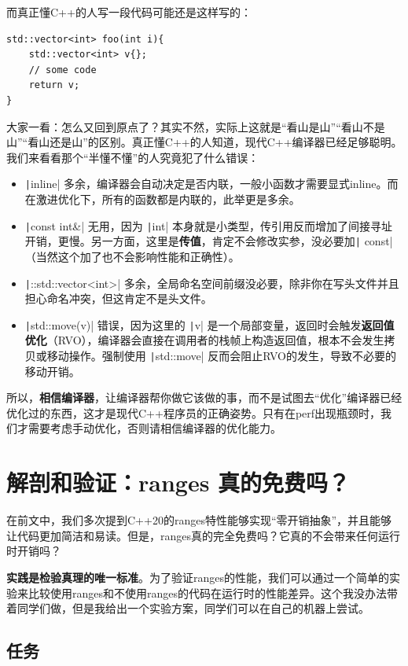 而真正懂C++的人写一段代码可能还是这样写的：
\begin{verbatim}
std::vector<int> foo(int i){
    std::vector<int> v{};
    // some code
    return v;
}
\end{verbatim}

大家一看：怎么又回到原点了？其实不然，实际上这就是“看山是山”“看山不是山”“看山还是山”的区别。真正懂C++的人知道，现代C++编译器已经足够聪明。我们来看看那个“半懂不懂”的人究竟犯了什么错误：
\begin{itemize}
    \item \texttt|inline| 多余，编译器会自动决定是否内联，一般小函数才需要显式inline。而在激进优化下，所有的函数都是内联的，此举更是多余。
    \item \texttt|const int&| 无用，因为 \texttt|int| 本身就是小类型，传引用反而增加了间接寻址开销，更慢。另一方面，这里是\textbf{传值}，肯定不会修改实参，没必要加\texttt| const|（当然这个加了也不会影响性能和正确性）。
    \item \texttt|::std::vector<int>| 多余，全局命名空间前缀没必要，除非你在写头文件并且担心命名冲突，但这肯定不是头文件。
    \item \texttt|std::move(v)| 错误，因为这里的 \texttt|v| 是一个局部变量，返回时会触发\textbf{返回值优化}（RVO），编译器会直接在调用者的栈帧上构造返回值，根本不会发生拷贝或移动操作。强制使用 \texttt|std::move| 反而会阻止RVO的发生，导致不必要的移动开销。
\end{itemize}

所以，\textbf{相信编译器}，让编译器帮你做它该做的事，而不是试图去“优化”编译器已经优化过的东西，这才是现代C++程序员的正确姿势。只有在perf出现瓶颈时，我们才需要考虑手动优化，否则请相信编译器的优化能力。

\section{解剖和验证：ranges 真的免费吗？}

在前文中，我们多次提到C++20的ranges特性能够实现“零开销抽象”，并且能够让代码更加简洁和易读。但是，ranges真的完全免费吗？它真的不会带来任何运行时开销吗？

\textbf{实践是检验真理的唯一标准}。为了验证ranges的性能，我们可以通过一个简单的实验来比较使用ranges和不使用ranges的代码在运行时的性能差异。这个我没办法带着同学们做，但是我给出一个实验方案，同学们可以在自己的机器上尝试。

\subsection{任务}

